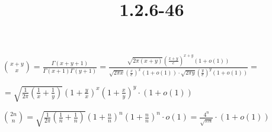 \documentclass{article}
\title{1.2.6-46}
\begin{document}
\maketitle

\( \binom{x+y}{x} = \frac{\Gamma(x+y+1)}{\Gamma(x+1)\Gamma(y+1)} = \frac{\sqrt{2 \pi (x+y)}(\frac{x+y}{e})^{x+y}(1+o(1))}{\sqrt{2 \pi x}(\frac{x}{e})^{x}(1+o(1)) \cdot {\sqrt{2 \pi y}(\frac{y}{e})^{y}(1+o(1))}} = \)

\( = \sqrt{\frac{1}{{2 \pi}}(\frac{1}{x} + \frac{1}{y})}(1+\frac{y}{x})^x (1+\frac{x}{y})^y \cdot (1+o(1)) \)

\( \binom{2n}{n} = \sqrt{\frac{1}{{2 \pi}}(\frac{1}{n} + \frac{1}{n})}(1+\frac{n}{n})^n (1+\frac{n}{n})^n \cdot o(1) = \frac{4^n}{\sqrt{\pi n}} \cdot (1 + o(1)) \)
\end{document}
